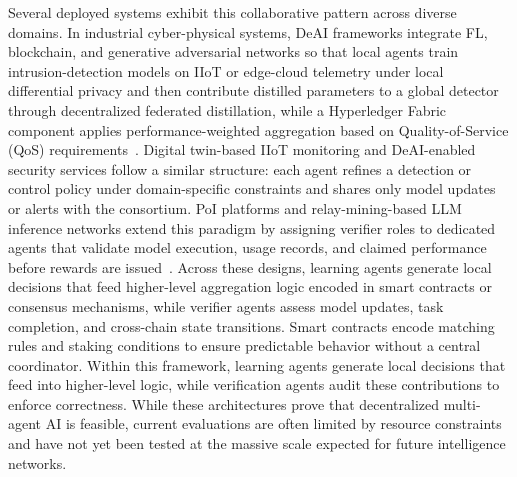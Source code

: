 \documentclass[5p,twocolumn]{elsarticle}
\begin{document}
Several deployed systems exhibit this collaborative pattern across diverse domains. In industrial cyber-physical systems, DeAI frameworks integrate FL, blockchain, and generative adversarial networks so that local agents train intrusion-detection models on IIoT or edge-cloud telemetry under local differential privacy and then contribute distilled parameters to a global detector through decentralized federated distillation, while a Hyperledger Fabric component applies performance-weighted aggregation based on Quality-of-Service (QoS) requirements~\cite{liang2024enhanced,canonico2023industrial}. Digital twin-based IIoT monitoring and DeAI-enabled security services follow a similar structure: each agent refines a detection or control policy under domain-specific constraints and shares only model updates or alerts with the consortium. PoI platforms and relay-mining-based LLM inference networks extend this paradigm by assigning verifier roles to dedicated agents that validate model execution, usage records, and claimed performance before rewards are issued~\cite{bhat2023sakshi}. Across these designs, learning agents generate local decisions that feed higher-level aggregation logic encoded in smart contracts or consensus mechanisms, while verifier agents assess model updates, task completion, and cross-chain state transitions. Smart contracts encode matching rules and staking conditions to ensure predictable behavior without a central coordinator. Within this framework, learning agents generate local decisions that feed into higher-level logic, while verification agents audit these contributions to enforce correctness. While these architectures prove that decentralized multi-agent AI is feasible, current evaluations are often limited by resource constraints and have not yet been tested at the massive scale expected for future intelligence networks.
\end{document}
